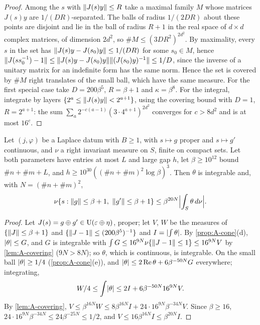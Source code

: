 \begin{proof}
Among the $s$ with $\lVert J(s)y\rVert\le R$ take a maximal family $M$ whose matrices $J(s)y$ are $1/(DR)$-separated. The balls of radius $1/(2DR)$ about these points are disjoint and lie in the ball of radius $R+1$ in the real space of
$d\times d$ complex matrices, of dimension $2d^2$, so $\#M\le(3DR^2)^{2d^2}$. By maximality, every $s$ in the set has $\lVert J(s)y-J(s_0)y\rVert\le1/(DR)$ for some $s_0\in M$, hence $\lVert J(s s_0^{-1})-1\rVert\le\lVert J(s)y-J(s_0)y\rVert\lVert (J(s_0)y)^{-1}\rVert\le1/D$, since the inverse of a
unitary matrix for an indefinite form has the same norm. Hence the set is covered by $\#M$ right translates of the small ball, which have the same measure. For the first special case take $D=200\beta^5$, $R=\beta+1$ and $\kappa=\beta^8$. For
the integral, integrate by layers $\{2^a\le\lVert J(s)y\rVert<2^{a+1}\}$, using the covering bound with $D=1$, $R=2^{a+1}$: the sum $\sum_a2^{-c(a-1)}(3\cdot4^{a+1})^{2d^2}$ converges for $c>8d^2$ and is at most $16^c$.
\end{proof}

\begin{theorem}\label{thm:A-laplace}
Let $(j,\varphi)$ be a Laplace datum with $B\ge1$, with $s\mapsto g$ proper and $s\mapsto g'$ continuous, and $\nu$ a right invariant measure on $S$, finite on compact sets. Let both parameters have entries at most $L$ and large gap $h$, let
$\beta\ge10^{12}$ bound $\#n+\#m+L$, and $h\ge10^{30}((\#n+\#m)^2\log\beta)^3$. Then $\theta$ is integrable and, with $N=(\#n+\#m)^2$,
\[
  \nu\{s:\norm g\le\beta+1,\ \norm{g'}\le\beta+1\}\le\beta^{20N}\Bigl\lvert\int_S\theta\,d\nu\Bigr\rvert.
\]
\end{theorem}

\begin{proof}
Let $J(s)=g\oplus g'\in\operatorname{U}(\varepsilon\oplus\eta)$, proper; let $V$, $W$ be the measures of $\{\lVert J\rVert\le\beta+1\}$ and $\{\lVert J-1\rVert\le(200\beta^5)^{-1}\}$ and $I=\lvert \int\theta\rvert$. By \cref{prop:A-cone}(d), $\lvert \theta\rvert\le G$, and $G$ is integrable with $\int G\le16^{9N}\nu\{\lVert J-1\rVert\le1\}\le16^{9N}V$ by \cref{lem:A-covering}
($9N>8N$); so $\theta$, which is continuous, is integrable. On the small ball $\lvert \theta\rvert\ge1/4$ (\cref{prop:A-cone}(e)), and $\lvert \theta\rvert\le2\operatorname{Re}\theta+6\beta^{-50N}G$ everywhere; integrating,
\[
  W/4\le\int\lvert \theta\rvert\le2I+6\beta^{-50N}16^{9N}V.
\]
By \cref{lem:A-covering}, $V\le\beta^{16N}W\le8\beta^{16N}I+24\cdot16^{9N}\beta^{-34N}V$. Since $\beta\ge16$, $24\cdot16^{9N}\beta^{-34N}\le24\beta^{-25N}\le1/2$, and $V\le16\beta^{16N}I\le\beta^{20N}I$.
\end{proof}

